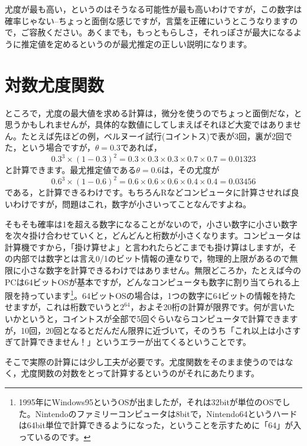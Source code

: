 \documentclass{ltjsbook}
\begin{document}
尤度が最も高い，というのはそうなる可能性が最も高いわけですが，この数字は確率じゃない--ちょっと面倒な感じですが，言葉を正確にいうとこうなりますので，ご容赦ください。あくまでも，もっともらしさ，それっぽさが最大になるように推定値を定めるというのが最尤推定の正しい説明になります。
\section{対数尤度関数}
ところで，尤度の最大値を求める計算は，微分を使うのでちょっと面倒だな，と思うかもしれませんが，具体的な数値にしてしまえばそれほど大変ではありません。たとえば先ほどの例，ベルヌーイ試行(コイントス)で表が3回，裏が2回でた，という場合ですが，$\theta=0.3$であれば，
\[ 0.3^3 \times (1-0.3)^2 = 0.3 \times 0.3 \times 0.3 \times 0.7 \times 0.7 = 0.01323 \]
と計算できます。最尤推定値である$\theta=0.6$は，その尤度が
\[ 0.6^3 \times (1-0.6)^2 = 0.6 \times 0.6 \times 0.6 \times 0.4 \times 0.4 = 0.03456 \]
である，と計算できるわけです。もちろんRなどコンピュータに計算させれば良いわけですが，問題はこれ，数字が小さいってことなんですよね。

そもそも確率は1を超える数字になることがないので，小さい数字に小さい数字を次々掛け合わせていくと，どんどんと桁数が小さくなります。コンピュータは計算機ですから，「掛け算せよ」と言われたらどこまでも掛け算はしますが，その内部では数字とは言え0/1のビット情報の連なりで，物理的上限があるので無限に小さな数字を計算できるわけではありません。無限どころか，たとえば今のPCは64ビットOSが基本ですが，どんなコンピュータも数字に割り当てられる上限を持っています\footnote{1995年にWindows95というOSが出ましたが，それは32bitが単位のOSでした。Nintendoのファミリーコンピュータは8bitで，Nintendo64というハードは64bit単位で計算できるようになった，ということを示すために「64」が入っているのです。}。64ビットOSの場合は，1つの数字に64ビットの情報を持たせますが，これは桁数でいうと$2^{64}$，およそ20桁の計算が限界です。何が言いたいかというと，コイントスが全部で5回ぐらいならコンピュータで計算できますが，10回，20回となるとだんだん限界に近づいて，そのうち「これ以上は小さすぎて計算できません！」というエラーが出てくるということです。

そこで実際の計算には少し工夫が必要です。尤度関数をそのまま使うのではなく，尤度関数の対数をとって計算するというのがそれにあたります。
\end{document}
